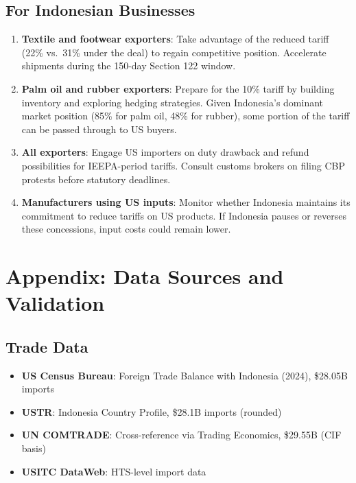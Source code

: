 \documentclass[12pt,a4paper]{article}
\begin{document}
\subsection{For Indonesian Businesses}

\begin{enumerate}
    \item \textbf{Textile and footwear exporters}: Take advantage of the reduced tariff (22\% vs.\ 31\% under the deal) to regain competitive position. Accelerate shipments during the 150-day Section 122 window.

    \item \textbf{Palm oil and rubber exporters}: Prepare for the 10\% tariff by building inventory and exploring hedging strategies. Given Indonesia's dominant market position (85\% for palm oil, 48\% for rubber), some portion of the tariff can be passed through to US buyers.

    \item \textbf{All exporters}: Engage US importers on duty drawback and refund possibilities for IEEPA-period tariffs. Consult customs brokers on filing CBP protests before statutory deadlines.

    \item \textbf{Manufacturers using US inputs}: Monitor whether Indonesia maintains its commitment to reduce tariffs on US products. If Indonesia pauses or reverses these concessions, input costs could remain lower.
\end{enumerate}

\section*{Appendix: Data Sources and Validation}

\subsection*{Trade Data}
\begin{itemize}
    \item \textbf{US Census Bureau}: Foreign Trade Balance with Indonesia (2024), \$28.05B imports
    \item \textbf{USTR}: Indonesia Country Profile, \$28.1B imports (rounded)
    \item \textbf{UN COMTRADE}: Cross-reference via Trading Economics, \$29.55B (CIF basis)
    \item \textbf{USITC DataWeb}: HTS-level import data
\end{itemize}
\end{document}
